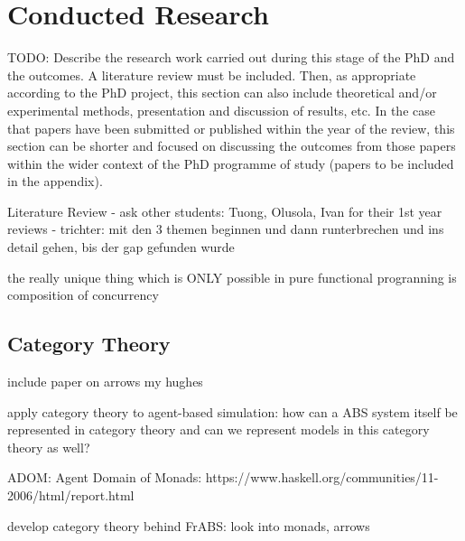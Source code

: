 \section{Conducted Research}
TODO: Describe the research work carried out during this stage of the PhD and the outcomes. A literature review must be included. Then, as appropriate according to the PhD project, this section can also include theoretical and/or experimental methods, presentation and discussion of results, etc. In the case that papers have been submitted or published within the year of the review, this section can be shorter and focused on discussing the outcomes from those papers within the wider context of the PhD programme of study (papers to be included in the appendix).

Literature Review
- ask other students: Tuong, Olusola, Ivan for their 1st year reviews
- trichter: mit den 3 themen beginnen und dann runterbrechen und ins detail gehen, bis der gap gefunden wurde


the really unique thing which is ONLY possible in pure functional progranning is composition of concurrency
 

\subsection{Category Theory}
include paper on arrows my hughes

apply category theory to agent-based simulation: how can a ABS system itself be represented in category theory and can we represent models in this category theory as well?

ADOM: Agent Domain of Monads: https://www.haskell.org/communities/11-2006/html/report.html

 develop category theory behind FrABS: look into monads, arrows